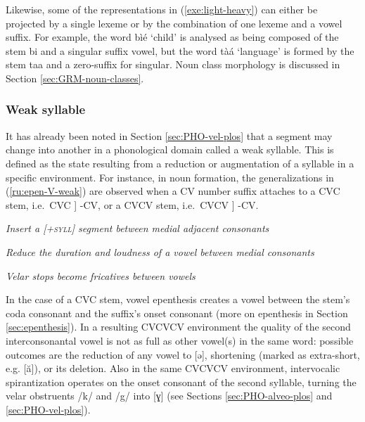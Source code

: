 Likewise,  some of the representations in (\ref{exe:light-heavy}) can
either be
projected by a single lexeme or by the combination of  one lexeme and a vowel
suffix.  For example,  the word {\sls bìé} `child' is analysed as being 
composed of the
stem {\sls bi}    and a singular suffix vowel, but the word {\sls tàá}  
`language' is  formed by the stem {\sls taa}  and a  zero-suffix for
singular.   Noun class morphology is discussed in Section 
\ref{sec:GRM-noun-classes}. 

 


\subsubsection{Weak syllable}
\label{sec:PHO-weak-syll}

It has already been noted in Section \ref{sec:PHO-vel-plos} that a segment may 
change into another in a phonological domain called a weak syllable.  This is  
defined  as the state resulting from a reduction or augmentation of a syllable 
in a specific environment.  For instance, in noun formation, the 
generalizations in 
(\ref{ru:epen-V-weak}) are observed when a CV number suffix attaches to a CVC 
stem, i.e.\ CVC ] -CV, or a CVCV stem, i.e.\ CVCV ] -CV. 



\ea\label{ru:epen-V-weak}
\par\nobreak\smallskip
 {\it Insert a \textsc{[+syll]} segment between medial adjacent 
consonants}

\par\nobreak\smallskip
 {\it Reduce the duration and loudness of a vowel between medial consonants}

\par\nobreak\smallskip
 {\it Velar stops become fricatives between vowels}

\z
\z

In the case of a CVC stem, vowel epenthesis creates a vowel between the stem's coda consonant and the suffix's onset consonant (more on epenthesis in Section \ref{sec:epenthesis}).   In a resulting CVCVCV environment the quality of the second interconsonantal vowel  is not  as full as other vowel(s) in the same word: possible outcomes are the reduction of any vowel to [{ə}],  shortening  (marked as extra-short, e.g.  [{ă}]),  or its  deletion. Also in the same CVCVCV environment, intervocalic spirantization operates on the onset consonant of the second syllable,  turning the velar obstruents /{k}/ and /{g}/ into [{ɣ}] (see Sections \ref{sec:PHO-alveo-plos} and \ref{sec:PHO-vel-plos}). 



